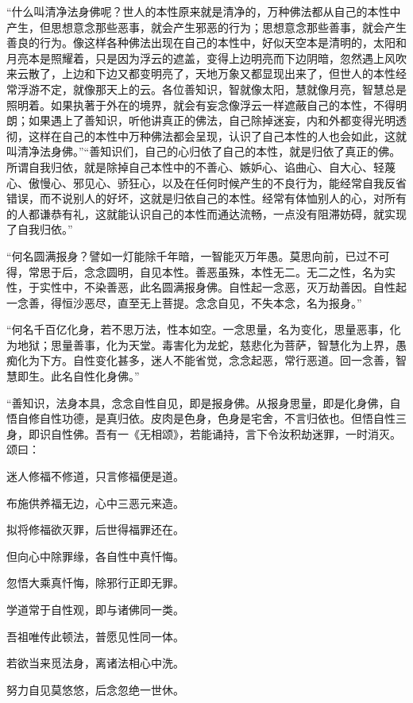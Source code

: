\documentclass[12pt,twoside,openany]{book}
\begin{document}
{“什么叫清净法身佛呢？世人的本性原来就是清净的，万种佛法都从自己的本性中产生，但思想意念那些恶事，就会产生邪恶的行为；思想意念那些善事，就会产生善良的行为。像这样各种佛法出现在自己的本性中，好似天空本是清明的，太阳和月亮本是照耀着，只是因为浮云的遮盖，变得上边明亮而下边阴暗，忽然遇上风吹来云散了，上边和下边又都变明亮了，天地万象又都显现出来了，但世人的本性经常浮游不定，就像那天上的云。各位善知识，智就像太阳，慧就像月亮，智慧总是照明着。如果执著于外在的境界，就会有妄念像浮云一样遮蔽自己的本性，不得明朗；如果遇上了善知识，听他讲真正的佛法，自己除掉迷妄，内和外都变得光明透彻，这样在自己的本性中万种佛法都会呈现，认识了自己本性的人也会如此，这就叫清净法身佛。”“善知识们，自己的心归依了自己的本性，就是归依了真正的佛。所谓自我归依，就是除掉自己本性中的不善心、嫉妒心、谄曲心、自大心、轻蔑心、傲慢心、邪见心、骄狂心，以及在任何时候产生的不良行为，能经常自我反省错误，而不说别人的好坏，这就是归依自己的本性。经常有体恤别人的心，对所有的人都谦恭有礼，这就能认识自己的本性而通达流畅，一点没有阻滞妨碍，就实现了自我归依。”}

“何名圆满报身？譬如{\color{red}一灯能除千年暗，一智能灭万年愚。}莫思向前，已过不可得，常思于后，念念圆明，自见本性。善恶虽殊，本性无二。无二之性，名为实性，于实性中，不染善恶，此名圆满报身佛。自性起一念恶，灭万劫善因。自性起一念善，得恒沙恶尽，直至无上菩提。念念自见，不失本念，名为报身。”

“何名千百亿化身，若不思万法，性本如空。一念思量，名为变化，思量恶事，化为地狱；思量善事，化为天堂。毒害化为龙蛇，慈悲化为菩萨，智慧化为上界，愚痴化为下方。自性变化甚多，迷人不能省觉，念念起恶，常行恶道。回一念善，智慧即生。此名自性化身佛。”

“善知识，法身本具，念念自性自见，即是报身佛。从报身思量，即是化身佛，自悟自修自性功德，是真归依。皮肉是色身，色身是宅舍，不言归依也。但悟自性三身，即识自性佛。吾有一《无相颂》，若能诵持，言下令汝积劫迷罪，一时消灭。颂曰：

迷人修福不修道，只言修福便是道。

布施供养福无边，心中三恶元来造。

拟将修福欲灭罪，后世得福罪还在。

但向心中除罪缘，各自性中真忏悔。

忽悟大乘真忏悔，除邪行正即无罪。

学道常于自性观，即与诸佛同一类。

吾祖唯传此顿法，普愿见性同一体。

若欲当来觅法身，离诸法相心中洗。

努力自见莫悠悠，后念忽绝一世休。
\end{document}
